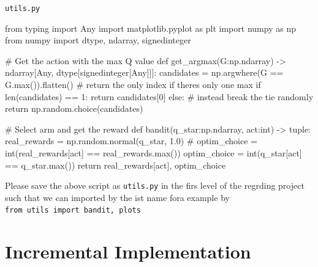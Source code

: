 \documentclass[
  letterpaper,
]{krantz}
\makeatletter
\newenvironment{Shaded}{\begin{snugshade}}{\end{snugshade}}
\newcommand{\BuiltInTok}[1]{\textcolor[rgb]{0.00,0.23,0.31}{#1}}
\newcommand{\CommentTok}[1]{\textcolor[rgb]{0.37,0.37,0.37}{#1}}
\newcommand{\ControlFlowTok}[1]{\textcolor[rgb]{0.00,0.23,0.31}{#1}}
\newcommand{\DecValTok}[1]{\textcolor[rgb]{0.68,0.00,0.00}{#1}}
\newcommand{\FloatTok}[1]{\textcolor[rgb]{0.68,0.00,0.00}{#1}}
\newcommand{\ImportTok}[1]{\textcolor[rgb]{0.00,0.46,0.62}{#1}}
\newcommand{\KeywordTok}[1]{\textcolor[rgb]{0.00,0.23,0.31}{#1}}
\newcommand{\NormalTok}[1]{\textcolor[rgb]{0.00,0.23,0.31}{#1}}
\newcommand{\OperatorTok}[1]{\textcolor[rgb]{0.37,0.37,0.37}{#1}}
\newenvironment{kframe}{%
\medskip{}
\setlength{\fboxsep}{.8em}
 \def\at@end@of@kframe{}%
 \ifinner\ifhmode%
  \def\at@end@of@kframe{\end{minipage}}%
  \begin{minipage}{\columnwidth}%
 \fi\fi%
 \def\FrameCommand##1{\hskip\@totalleftmargin \hskip-\fboxsep
 \colorbox{shadecolor}{##1}\hskip-\fboxsep
     \hskip-\linewidth \hskip-\@totalleftmargin \hskip\columnwidth}%
 \MakeFramed {\advance\hsize-\width
   \@totalleftmargin\z@ \linewidth\hsize
   \@setminipage}}%
 {\par\unskip\endMakeFramed%
 \at@end@of@kframe}
\renewenvironment{Shaded}{\begin{kframe}}{\end{kframe}}
\theoremstyle{plain}
\theoremstyle{definition}
\theoremstyle{definition}
\theoremstyle{remark}
\makeatother
\begin{document}
\begin{codelisting}

\caption{\texttt{utils.py}}

\begin{Shaded}
\begin{Highlighting}[]
\ImportTok{from}\NormalTok{ typing }\ImportTok{import}\NormalTok{ Any}
\ImportTok{import}\NormalTok{ matplotlib.pyplot }\ImportTok{as}\NormalTok{ plt}
\ImportTok{import}\NormalTok{ numpy }\ImportTok{as}\NormalTok{ np}
\ImportTok{from}\NormalTok{ numpy }\ImportTok{import}\NormalTok{ dtype, ndarray, signedinteger}


\CommentTok{\# Get the action with the max Q value}
\KeywordTok{def}\NormalTok{ get\_argmax(G:np.ndarray) }\OperatorTok{{-}\textgreater{}}\NormalTok{ ndarray[Any, dtype[signedinteger[Any]]]:}
\NormalTok{    candidates }\OperatorTok{=}\NormalTok{ np.argwhere(G }\OperatorTok{==}\NormalTok{ G.}\BuiltInTok{max}\NormalTok{()).flatten()}
    \CommentTok{\# return the only index if there\textquotesingle{}s only one max}
    \ControlFlowTok{if} \BuiltInTok{len}\NormalTok{(candidates) }\OperatorTok{==} \DecValTok{1}\NormalTok{:}
        \ControlFlowTok{return}\NormalTok{ candidates[}\DecValTok{0}\NormalTok{]}
    \ControlFlowTok{else}\NormalTok{:}
        \CommentTok{\# instead break the tie randomly}
        \ControlFlowTok{return}\NormalTok{ np.random.choice(candidates)}


\CommentTok{\# Select arm and get the reward}
\KeywordTok{def}\NormalTok{ bandit(q\_star:np.ndarray, }
\NormalTok{           act:}\BuiltInTok{int}\NormalTok{) }\OperatorTok{{-}\textgreater{}} \BuiltInTok{tuple}\NormalTok{:}
\NormalTok{    real\_rewards }\OperatorTok{=}\NormalTok{ np.random.normal(q\_star, }\FloatTok{1.0}\NormalTok{)}
    \CommentTok{\# optim\_choice = int(real\_rewards[act] == real\_rewards.max())}
\NormalTok{    optim\_choice }\OperatorTok{=} \BuiltInTok{int}\NormalTok{(q\_star[act] }\OperatorTok{==}\NormalTok{ q\_star.}\BuiltInTok{max}\NormalTok{())}
    \ControlFlowTok{return}\NormalTok{ real\_rewards[act], optim\_choice}
\end{Highlighting}
\end{Shaded}

\end{codelisting}

Please save the above script as \texttt{utils.py} in the firs level of
the regrding project such that we can imported by the ist name fora
example by \texttt{from\ utils\ import\ bandit,\ plots}

\section{Incremental Implementation}\label{incremental-implementation}
\end{document}
